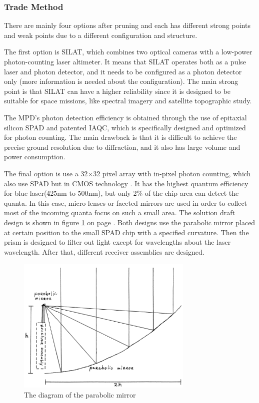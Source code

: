 \subsubsection{Trade Method}
\label{TOReceiverM}
There are mainly four options after pruning and each has different strong points and weak points due to a different configuration and structure. 

The first option is \ac{SILAT}, which combines two optical cameras with a low-power photon-counting laser altimeter. It means that \acs{SILAT} operates both as a pulse laser and photon detector, and it needs to be configured as a photon detector only (more information is needed about the configuration). The main strong point is that \acs{SILAT} can have a higher reliability since it is designed to be suitable for space missions, like spectral imagery and satellite topographic study.

The \ac{MPD}'s photon detection efficiency is obtained through the use of epitaxial silicon \ac{SPAD} and patented \ac{IAQC}, which is specifically designed and optimized for photon counting. The main drawback is that it is difficult to achieve the precise ground resolution due to diffraction, and it also has large volume and power consumption.

The final option is use a 32$\times$32 pixel array with in-pixel photon counting, which also use \acs{SPAD} but in \ac{CMOS} technology \cite{SPAD}. It has the highest quantum efficiency for blue laser(425nm to 500nm), but only 2\% of the chip area can detect the quanta. In this case, micro lenses or faceted mirrors are used in order to collect most of the incoming quanta focus on such a small area. The solution draft design is shown in figure \ref{fig:diagram_Rgeneral} on page \pageref{fig:diagram_Rgeneral}. Both designs use the parabolic mirror placed at certain position to the small \acs{SPAD} chip with a specified curvature. Then the prism is designed to filter out light except for wavelengths about the laser wavelength. After that, different receiver assemblies are designed.

\begin{figure}[ht!]
\centering
\includegraphics[width=0.75\textwidth]{chapters/img/DiagramReceiverGeneral.png}
\caption{The diagram of the parabolic mirror}
\label{fig:diagram_Rgeneral}
\end{figure}

